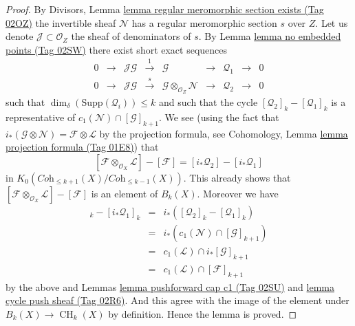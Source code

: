 \documentclass{amsart}
\theoremstyle{plain}
\theoremstyle{definition}
\theoremstyle{remark}
\numberwithin{equation}{subsection}
\def\CH{\mathop{\mathrm{CH}}\nolimits}
\begin{document}
\begin{proof}
\medskip\noindent
By Divisors, Lemma \href{https://stacks.math.columbia.edu/tag/02OZ}{lemma regular meromorphic section exists (Tag 02OZ)}
the invertible sheaf $\mathcal{N}$ has a regular meromorphic section $s$
over $Z$. Let us denote $\mathcal{J} \subset \mathcal{O}_Z$ the sheaf
of denominators of $s$. By Lemma \href{https://stacks.math.columbia.edu/tag/02SW}{lemma no embedded points (Tag 02SW)}
there exist short exact sequences
$$
\begin{matrix}
0 &
\to &
\mathcal{J}\mathcal{G} &
\xrightarrow{1} &
\mathcal{G} &
\to &
\mathcal{Q}_1 &
\to &
0 \\
0 &
\to &
\mathcal{J}\mathcal{G} &
\xrightarrow{s} &
\mathcal{G} \otimes_{\mathcal{O}_Z} \mathcal{N} &
\to &
\mathcal{Q}_2 &
\to &
0
\end{matrix}
$$
such that $\dim_\delta(\text{Supp}(\mathcal{Q}_i)) \leq k$ and
such that the cycle
$
[\mathcal{Q}_2]_k - [\mathcal{Q}_1]_k
$
is a representative of $c_1(\mathcal{N}) \cap [\mathcal{G}]_{k + 1}$.
We see (using the fact that
$i_*(\mathcal{G} \otimes \mathcal{N}) = \mathcal{F} \otimes \mathcal{L}$
by the projection formula, see
Cohomology, Lemma \href{https://stacks.math.columbia.edu/tag/01E8}{lemma projection formula (Tag 01E8)})
that
$$
[\mathcal{F} \otimes_{\mathcal{O}_X} \mathcal{L}]
-
[\mathcal{F}]
=
[i_*\mathcal{Q}_2] - [i_*\mathcal{Q}_1]
$$
in $K_0(\textit{Coh}_{\leq k + 1}(X)/\textit{Coh}_{\leq k - 1}(X))$.
This already shows that
$[\mathcal{F} \otimes_{\mathcal{O}_X} \mathcal{L}] - [\mathcal{F}]$
is an element of $B_k(X)$. Moreover we have
\begin{eqnarray*}
[i_*\mathcal{Q}_2]_k - [i_*\mathcal{Q}_1]_k
& = &
i_*\left( [\mathcal{Q}_2]_k - [\mathcal{Q}_1]_k \right) \\
& = &
i_*\left(c_1(\mathcal{N}) \cap [\mathcal{G}]_{k + 1} \right) \\
& = &
c_1(\mathcal{L}) \cap i_*[\mathcal{G}]_{k + 1} \\
& = &
c_1(\mathcal{L}) \cap [\mathcal{F}]_{k + 1}
\end{eqnarray*}
by the above and Lemmas \href{https://stacks.math.columbia.edu/tag/02SU}{lemma pushforward cap c1 (Tag 02SU)}
and \href{https://stacks.math.columbia.edu/tag/02R6}{lemma cycle push sheaf (Tag 02R6)}. And this agree with the
image of the element under $B_k(X) \to \CH_k(X)$ by definition.
Hence the lemma is proved.
\end{proof}
\end{document}
